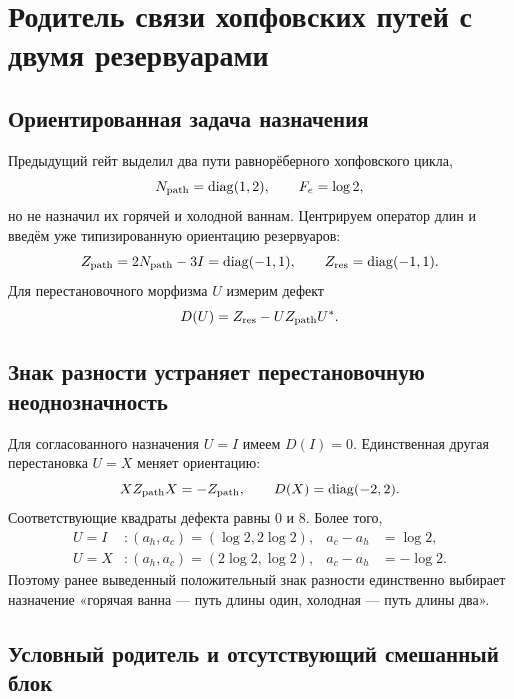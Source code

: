 \chapter{Родитель связи хопфовских путей с двумя резервуарами}
\label{ch:v10-hopf-path-reservoir-coupling-parent}

\section{Ориентированная задача назначения}

Предыдущий гейт выделил два пути равнорёберного хопфовского цикла,
\begin{equation}
 N_{\rm path}=\operatorname{diag}(1,2),\qquad F_e=\log2,
\end{equation}
но не назначил их горячей и холодной ваннам. Центрируем оператор длин и
введём уже типизированную ориентацию резервуаров:
\begin{equation}
 Z_{\rm path}=2N_{\rm path}-3I=\operatorname{diag}(-1,1),\qquad
 Z_{\rm res}=\operatorname{diag}(-1,1).
\end{equation}
Для перестановочного морфизма $U$ измерим дефект
\begin{equation}
 D(U)=Z_{\rm res}-UZ_{\rm path}U^*.
\end{equation}

\section{Знак разности устраняет перестановочную неоднозначность}

Для согласованного назначения $U=I$ имеем $D(I)=0$. Единственная другая
перестановка $U=X$ меняет ориентацию:
\begin{equation}
 XZ_{\rm path}X=-Z_{\rm path},\qquad
 D(X)=\operatorname{diag}(-2,2).
\end{equation}
Соответствующие квадраты дефекта равны $0$ и $8$. Более того,
\begin{align}
 U=I &: (a_h,a_c)=(\log2,2\log2),&a_c-a_h&=\log2,\\
 U=X &: (a_h,a_c)=(2\log2,\log2),&a_c-a_h&=-\log2.
\end{align}
Поэтому ранее выведенный положительный знак разности единственно выбирает
назначение «горячая ванна --- путь длины один, холодная --- путь длины два».

\section{Условный родитель и отсутствующий смешанный блок}

